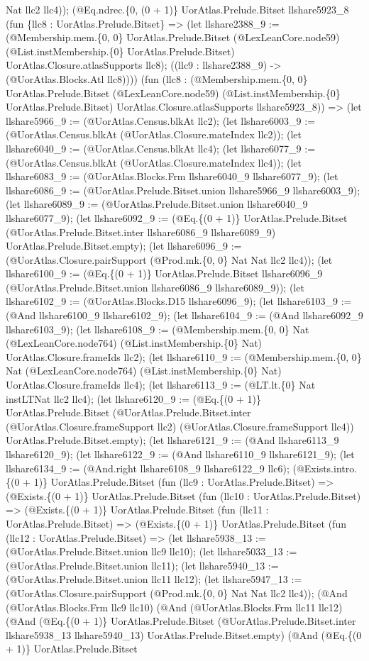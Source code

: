 \documentclass[11pt]{article}
\begin{document}
Nat llc2 llc4)); (@Eq.ndrec.\{0, (0 + 1)\} UorAtlas.Prelude.Bitset llshare5923\_8 (fun \{llc8 : UorAtlas.Prelude.Bitset\} => (let llshare2388\_9 := (@Membership.mem.\{0, 0\} UorAtlas.Prelude.Bitset (@LexLeanCore.node59) (@List.instMembership.\{0\} UorAtlas.Prelude.Bitset) UorAtlas.Closure.atlasSupports llc8); ((llc9 : llshare2388\_9) -> (@UorAtlas.Blocks.Atl llc8)))) (fun (llc8 : (@Membership.mem.\{0, 0\} UorAtlas.Prelude.Bitset (@LexLeanCore.node59) (@List.instMembership.\{0\} UorAtlas.Prelude.Bitset) UorAtlas.Closure.atlasSupports llshare5923\_8)) => (let llshare5966\_9 := (@UorAtlas.Census.blkAt llc2); (let llshare6003\_9 := (@UorAtlas.Census.blkAt (@UorAtlas.Closure.mateIndex llc2)); (let llshare6040\_9 := (@UorAtlas.Census.blkAt llc4); (let llshare6077\_9 := (@UorAtlas.Census.blkAt (@UorAtlas.Closure.mateIndex llc4)); (let llshare6083\_9 := (@UorAtlas.Blocks.Frm llshare6040\_9 llshare6077\_9); (let llshare6086\_9 := (@UorAtlas.Prelude.Bitset.union llshare5966\_9 llshare6003\_9); (let llshare6089\_9 := (@UorAtlas.Prelude.Bitset.union llshare6040\_9 llshare6077\_9); (let llshare6092\_9 := (@Eq.\{(0 + 1)\} UorAtlas.Prelude.Bitset (@UorAtlas.Prelude.Bitset.inter llshare6086\_9 llshare6089\_9) UorAtlas.Prelude.Bitset.empty); (let llshare6096\_9 := (@UorAtlas.Closure.pairSupport (@Prod.mk.\{0, 0\} Nat Nat llc2 llc4)); (let llshare6100\_9 := (@Eq.\{(0 + 1)\} UorAtlas.Prelude.Bitset llshare6096\_9 (@UorAtlas.Prelude.Bitset.union llshare6086\_9 llshare6089\_9)); (let llshare6102\_9 := (@UorAtlas.Blocks.D15 llshare6096\_9); (let llshare6103\_9 := (@And llshare6100\_9 llshare6102\_9); (let llshare6104\_9 := (@And llshare6092\_9 llshare6103\_9); (let llshare6108\_9 := (@Membership.mem.\{0, 0\} Nat (@LexLeanCore.node764) (@List.instMembership.\{0\} Nat) UorAtlas.Closure.frameIds llc2); (let llshare6110\_9 := (@Membership.mem.\{0, 0\} Nat (@LexLeanCore.node764) (@List.instMembership.\{0\} Nat) UorAtlas.Closure.frameIds llc4); (let llshare6113\_9 := (@LT.lt.\{0\} Nat instLTNat llc2 llc4); (let llshare6120\_9 := (@Eq.\{(0 + 1)\} UorAtlas.Prelude.Bitset (@UorAtlas.Prelude.Bitset.inter (@UorAtlas.Closure.frameSupport llc2) (@UorAtlas.Closure.frameSupport llc4)) UorAtlas.Prelude.Bitset.empty); (let llshare6121\_9 := (@And llshare6113\_9 llshare6120\_9); (let llshare6122\_9 := (@And llshare6110\_9 llshare6121\_9); (let llshare6134\_9 := (@And.right llshare6108\_9 llshare6122\_9 llc6); (@Exists.intro.\{(0 + 1)\} UorAtlas.Prelude.Bitset (fun (llc9 : UorAtlas.Prelude.Bitset) => (@Exists.\{(0 + 1)\} UorAtlas.Prelude.Bitset (fun (llc10 : UorAtlas.Prelude.Bitset) => (@Exists.\{(0 + 1)\} UorAtlas.Prelude.Bitset (fun (llc11 : UorAtlas.Prelude.Bitset) => (@Exists.\{(0 + 1)\} UorAtlas.Prelude.Bitset (fun (llc12 : UorAtlas.Prelude.Bitset) => (let llshare5938\_13 := (@UorAtlas.Prelude.Bitset.union llc9 llc10); (let llshare5033\_13 := (@UorAtlas.Prelude.Bitset.union llc11); (let llshare5940\_13 := (@UorAtlas.Prelude.Bitset.union llc11 llc12); (let llshare5947\_13 := (@UorAtlas.Closure.pairSupport (@Prod.mk.\{0, 0\} Nat Nat llc2 llc4)); (@And (@UorAtlas.Blocks.Frm llc9 llc10) (@And (@UorAtlas.Blocks.Frm llc11 llc12) (@And (@Eq.\{(0 + 1)\} UorAtlas.Prelude.Bitset (@UorAtlas.Prelude.Bitset.inter llshare5938\_13 llshare5940\_13) UorAtlas.Prelude.Bitset.empty) (@And (@Eq.\{(0 + 1)\} UorAtlas.Prelude.Bitset 
\end{document}
